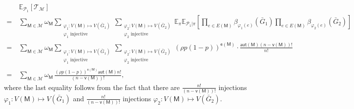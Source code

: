 \documentclass[letterpaper,11pt]{article}
\theoremstyle{definition}
\newcommand{\maM}{\mathcal{M}}
\newcommand{\maP}{\mathcal{P}}
\newcommand{\maT}{\mathcal{T}}
\newcommand{\en}{\mathsf{{e}}}
\newcommand{\vn}{\mathsf{{v}}}
\newcommand{\pth}[1]{\left( #1 \right)}
\newcommand{\qth}[1]{\left[ #1 \right]}
\newcommand{\sfM}{{\mathsf{M}}}
\newcommand{\aut}{\mathsf{aut}}
\newcommand{\vp}{\varphi}
\def\E{\mathbb{E}}
\begin{document}
\begin{align}
    \nonumber &~\E_{\maP_1}\qth{\maT_{\maM}}\\\nonumber =&~\sum_{\sfM\in \maM}\omega_\sfM\sum_{\substack{\varphi_1:V(\sfM)\mapsto V(\bar{G}_1)\\\varphi_1\text{ injective}}}\sum_{\substack{\varphi_2:V(\sfM)\mapsto V(\bar{G}_2)\\\varphi_2\text{ injective}}} \E_\pi\E_{\maP_1|\pi}\qth{\prod_{e\in E(\sfM)} \beta_{\varphi_1(e)}(\bar{G}_1)\prod_{e\in E(\sfM)} \beta_{\varphi_2(e)}(\bar{G}_2)}\\\nonumber 
    =&~\sum_{\sfM\in \maM}\omega_\sfM\sum_{\substack{\varphi_1:V(\sfM)\mapsto V(\bar{G}_1)\\\varphi_1\text{ injective}}}\sum_{\substack{\varphi_2:V(\sfM)\mapsto V(\bar{G}_2)\\\varphi_2\text{ injective}}} \pth{\rho p (1-p)}^{\en(\sfM)}\cdot \frac{\aut(\sfM)(n-\vn(\sfM))!}{n!}\\ \label{eq:EPmaT}=&~ \sum_{\sfM\in \maM} \omega_\sfM\, \frac{(\rho p (1-p))^{\en(\sfM)}\aut(\sfM) n!}{(n-\vn(\sfM))!},
\end{align}
where the last equality follows from the fact that there are $\frac{n!}{(n-\vn(\sfM))!}$ injections $\vp_1:V(\sfM)\mapsto V(\bar{G}_1)$ and $\frac{n!}{(n-\vn(\sfM))!}$ injections $\vp_2:V(\sfM)\mapsto V(\bar{G}_2)$.
\end{document}
